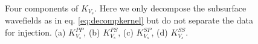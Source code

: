 \begin{figure}[!htb]
   \centering
   \\
   \caption{Four components of $K_{V_s}$. Here we only decompose the subsurface wavefields as in
   eq. \eqref{eq:decompkernel} but do not separate the data for injection. 
   (a) $K_{V_s}^{PP}$, (b) $K_{V_s}^{PS}$, (c) $K_{V_s}^{SP}$, (d) $K_{V_s}^{SS}$.}
   \label{fig:kernel2_vs_decomp}
\end{figure}
